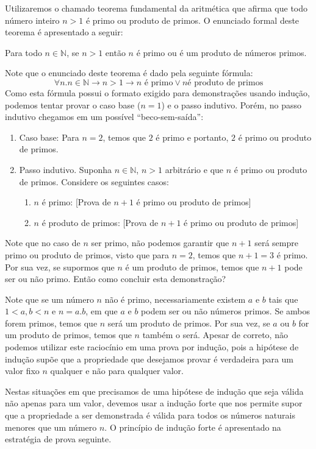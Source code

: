 Utilizaremos o chamado teorema fundamental da aritmética que afirma
que todo número inteiro $n > 1$ é primo ou produto de primos. O
enunciado formal deste teorema é apresentado a seguir:

\begin{Theorem}\label{strong-ind1}
Para todo $n\in\mathbb{N}$, se $n > 1$ então $n$ é primo ou é um
produto de números primos.
\end{Theorem}

Note que o enunciado deste teorema é dado pela seguinte fórmula:
\[
\forall n. n\in\mathbb{N} \to n > 1 \to n\text{ é primo} \lor n\text{
  é produto de primos}
\]
Como esta fórmula possui o formato exigido para demonstrações
usando indução, podemos tentar provar o caso base ($n = 1$) e o passo
indutivo. Porém, no passo indutivo chegamos em um possível ``beco-sem-saída'':
\begin{enumerate}
  \item[\ ]Caso base: Para $n = 2$, temos que $2$ é primo e portanto,
    $2$ é primo ou produto de primos.
  \item[\ ]Passo indutivo. Suponha $n\in\mathbb{N}$, $n > 1$
    arbitrário e que $n$ é primo ou produto de primos. Considere os
    seguintes casos:
    \begin{enumerate}
      \item[\ ] $n$ é primo: [Prova de $n + 1$ é primo ou produto de primos]
      \item[\ ] $n$ é produto de primos: [Prova de $n + 1$ é primo ou produto de primos]
    \end{enumerate}
\end{enumerate}
Note que no caso de $n$ ser primo, não podemos garantir que $n + 1$
será sempre primo ou produto de primos, visto que para $n = 2$, temos
que $n + 1 = 3$ é primo. Por sua vez, se supormos que $n$ é um produto
de primos, temos que $n + 1$ pode ser ou não primo. Então como
concluir esta demonstração?

Note que se um número $n$ não é primo, necessariamente existem $a$ e
$b$ tais que $1 < a,b < n$ e $n = a.b$, em que $a$ e $b$ podem ser ou
não números primos. Se ambos forem primos, temos que $n$ será um
produto de primos. Por sua vez, se  $a$ ou $b$ for um produto de
primos, temos que $n$ também o será. Apesar de correto, não podemos
utilizar este raciocínio em uma prova por indução, pois a hipótese de
indução supõe que a propriedade que desejamos provar é verdadeira para
um valor fixo $n$ qualquer e não para qualquer valor.

Nestas situações em que precisamos de uma hipótese de indução que seja
válida não apenas para um valor, devemos usar a indução forte que nos
permite supor que a propriedade a ser demonstrada é válida para todos
os números naturais menores que um número $n$. O princípio de indução
forte é apresentado na estratégia de prova seguinte.

